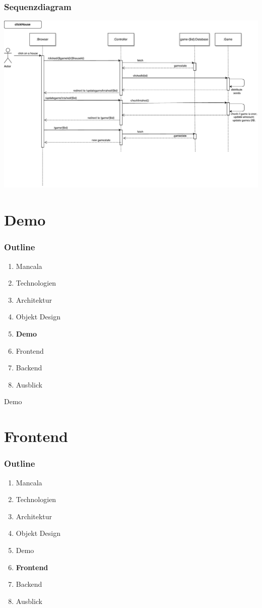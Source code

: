 \documentclass[
	10pt,
	t		%
]{beamer}
\begin{document}
\begin{frame}
\frametitle{Sequenzdiagram}
\begin{center}
\includegraphics[scale=0.32]{./../Diagrams/Sequence_clickHouse.pdf}
\end{center}
\end{frame}

\section{Demo}
\begin{frame}
\frametitle{Outline}
\begin{enumerate}
\item Mancala
\item Technologien
\item Architektur
\item Objekt Design
\item \textbf{Demo}
\item Frontend
\item Backend
\item Ausblick
\end{enumerate}
\end{frame}

\begin{frame}[plain, c]
\begin{center}
\Large Demo
\end{center}
\end{frame}

\section{Frontend}
\begin{frame}
\frametitle{Outline}
\begin{enumerate}
\item Mancala
\item Technologien
\item Architektur
\item Objekt Design
\item Demo
\item \textbf{Frontend}
\item Backend
\item Ausblick
\end{enumerate}
\end{frame}
\end{document}
